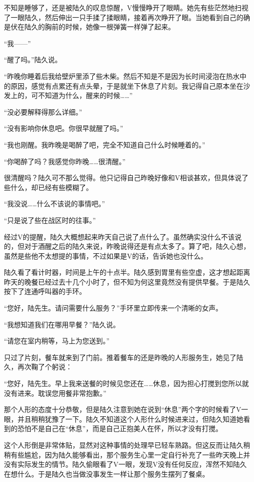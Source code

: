 不知是睡够了，还是被陆久的叹息惊醒，V慢慢睁开了眼睛。她先有些茫然地扫视了一眼陆久，然后伸出一只手揉了揉眼睛，接着再次睁开了眼。当她看到自己的确是伏在陆久的胸前的时候，她像一根弹簧一样弹了起来。

“我——”

“醒了吗。”陆久说。

“昨晚你睡着后我给壁炉里添了些木柴。然后不知是不是因为长时间浸泡在热水中的原因，感觉有点累还有点头晕，于是就坐下休息了片刻。我记得自己原本坐在沙发上的，可不知道为什么，醒来的时候……”

“没必要解释得那么详细。”

“没有影响你休息吧。你很早就醒了吗。”

“我也刚醒。我昨晚是喝醉了吧，完全不知道自己什么时候睡着的。”

“你喝醉了吗？我感觉你昨晚……很清醒。”

很清醒吗？陆久可不那么觉得。他只记得自己昨晚好像和V相谈甚欢，但具体说了些什么，却已经有些模糊了。

“我没说……什么不该说的事情吧。”

“只是说了些在战区时的往事。”

经过V的提醒，陆久大概想起来昨天自己说了点什么了。虽然确实没什么不该说的，但对于酒醒之后的陆久来说，昨晚说得还是有点太多了。算了吧，陆久心想，虽然是些他不太想提的事情，不过如果是V的话，告诉她也没什么。

陆久看了看计时器，时间是上午的十点半。陆久感到胃里有些空虚，这才想起距离昨天的晚餐已经过去十几个小时了，但不知为何这里竟然没有提供早餐。于是陆久按下了连通呼叫器的手环。

“您好，陆先生。请问需要什么服务？”手环里立即传来一个清晰的女声。

“我想知道我们在哪用早餐？”陆久说。

“请您在室内稍等，马上为您送到。”

只过了片刻，餐车就来到了门前。推着餐车的还是昨晚的人形服务生，她见了陆久，再次鞠了个躬说：

“您好，陆先生。早上我来送餐的时候见您还在……休息，因为担心打搅到您所以就没有进来。耽误您用餐非常抱歉。”

那个人形的态度十分恭敬，但是陆久注意到她在说到“休息”两个字的时候看了V一眼，并且稍稍犹豫了一下。陆久不知道这个人形什么时候进来过，但陆久知道她看到的恐怕不是自己在“休息”，而是自己正抱美人在怀，所以才没有打搅。

这个人形倒是非常体贴，显然对这种事情的处理早已轻车熟路。但这反而让陆久稍稍有些尴尬，因为陆久能够看出，那个服务生心里一定自行补充了一些昨天晚上并没有实际发生的情节。陆久偷眼看了V一眼，发现V没有任何反应，浑然不知陆久在想什么。于是陆久也当做没事发生一样让那个服务生摆列了餐桌。

